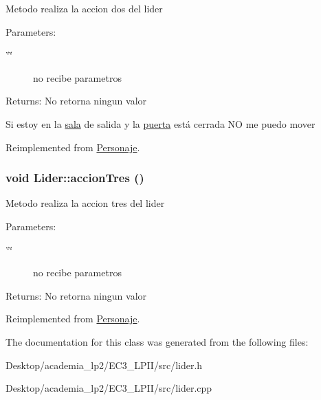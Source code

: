 Metodo realiza la accion dos del lider \begin{Desc}
\item[Parameters:]
\begin{description}
\item[{\em \char`\"{}\char`\"{}}]no recibe parametros \end{description}
\end{Desc}
\begin{Desc}
\item[Returns:]No retorna ningun valor \end{Desc}


Si estoy en la \hyperlink{classsala}{sala} de salida y la \hyperlink{classpuerta}{puerta} está cerrada NO me puedo mover 

Reimplemented from \hyperlink{classPersonaje_af7763eb6099390038b7833129a1ef9f}{Personaje}.\hypertarget{classLider_993a29f5a5615bd8a41dfe550dfccb61}{
\subsubsection[accionTres]{\setlength{\rightskip}{0pt plus 5cm}void Lider::accionTres ()}}
\label{classLider_993a29f5a5615bd8a41dfe550dfccb61}


Metodo realiza la accion tres del lider \begin{Desc}
\item[Parameters:]
\begin{description}
\item[{\em \char`\"{}\char`\"{}}]no recibe parametros \end{description}
\end{Desc}
\begin{Desc}
\item[Returns:]No retorna ningun valor \end{Desc}


Reimplemented from \hyperlink{classPersonaje_85c25ff0362bf4f4f5e69965c1ae4cfb}{Personaje}.

The documentation for this class was generated from the following files:\begin{CompactItemize}
\item 
Desktop/academia\_\-lp2/EC3\_\-LPII/src/lider.h\item 
Desktop/academia\_\-lp2/EC3\_\-LPII/src/lider.cpp\end{CompactItemize}
